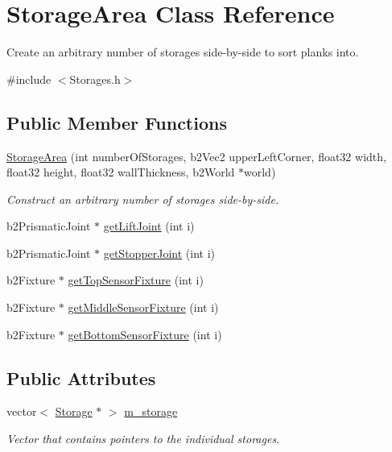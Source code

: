 \hypertarget{classStorageArea}{\section{Storage\-Area Class Reference}
\label{classStorageArea}
}


Create an arbitrary number of storages side-\/by-\/side to sort planks into.  




{\ttfamily \#include $<$Storages.\-h$>$}

\subsection*{Public Member Functions}
\begin{DoxyCompactItemize}
\item 
\hyperlink{classStorageArea_a4a5f9f5686f968f55810b61ad7842650}{Storage\-Area} (int number\-Of\-Storages, b2\-Vec2 upper\-Left\-Corner, float32 width, float32 height, float32 wall\-Thickness, b2\-World $\ast$world)
\begin{DoxyCompactList}\small\item\em Construct an arbitrary number of storages side-\/by-\/side. \end{DoxyCompactList}\item 
b2\-Prismatic\-Joint $\ast$ \hyperlink{classStorageArea_a0885600a2b998f164acdc93f88d384d0}{get\-Lift\-Joint} (int i)
\item 
b2\-Prismatic\-Joint $\ast$ \hyperlink{classStorageArea_aea535b0b0abe0235582239ab0851b73e}{get\-Stopper\-Joint} (int i)
\item 
b2\-Fixture $\ast$ \hyperlink{classStorageArea_a1c797933bfbf9e3aaef52190630277e4}{get\-Top\-Sensor\-Fixture} (int i)
\item 
b2\-Fixture $\ast$ \hyperlink{classStorageArea_a2ea9264e9f7243ca6f2e66e99e5d13a8}{get\-Middle\-Sensor\-Fixture} (int i)
\item 
b2\-Fixture $\ast$ \hyperlink{classStorageArea_a3c2ddd3fe7e2f26b9be4ec9564257f5d}{get\-Bottom\-Sensor\-Fixture} (int i)
\end{DoxyCompactItemize}
\subsection*{Public Attributes}
\begin{DoxyCompactItemize}
\item 
vector$<$ \hyperlink{classStorage}{Storage} $\ast$ $>$ \hyperlink{classStorageArea_ab5c3b86896768610f1b558126bf0df71}{m\-\_\-storage}
\begin{DoxyCompactList}\small\item\em Vector that contains pointers to the individual storages. \end{DoxyCompactList}\end{DoxyCompactItemize}


